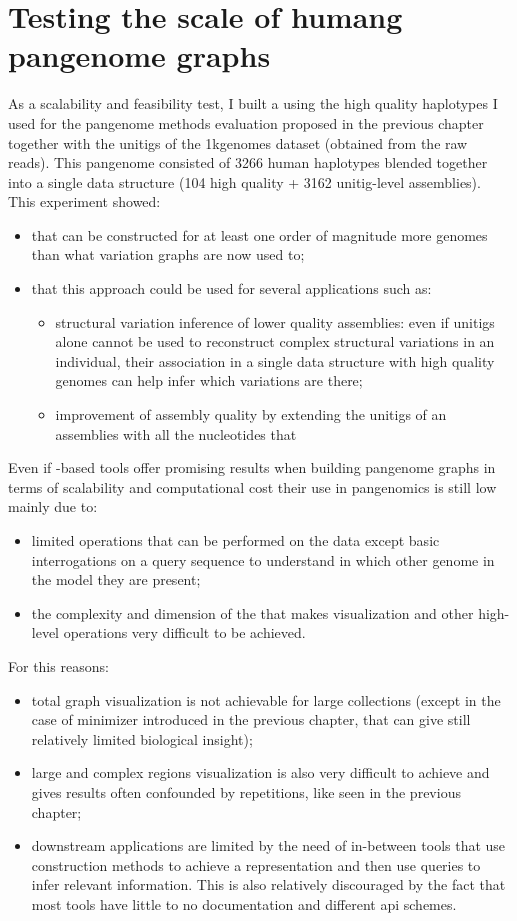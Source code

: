 \section{Testing the scale of humang pangenome graphs}
As a scalability and feasibility test, I built a \ccdbg using the high quality haplotypes I used for the pangenome methods evaluation proposed in the previous chapter together with the unitigs of the 1kgenomes dataset (obtained from the raw reads). This pangenome consisted of 3266 human haplotypes blended together into a single data structure (104 high quality + 3162 unitig-level assemblies). This experiment showed:
\begin{itemize}
	\item that \ccdbgs can be constructed for at least one order of magnitude more genomes than what variation graphs are now used to;
	\item that this approach could be used for several applications such as:
	\begin{itemize}
		\item structural variation inference of lower quality assemblies: even if unitigs alone cannot be used to reconstruct complex structural variations in an individual, their association in a single data structure with high quality genomes can help infer which variations are there;
		\item improvement of assembly quality by extending the unitigs of an assemblies with all the nucleotides that 
	\end{itemize}
\end{itemize}
Even if \dbg-based tools offer promising results when building pangenome graphs in terms of scalability and computational cost their use in pangenomics is still low mainly due to:
\begin{itemize}
	\item limited operations that can be performed on the data except basic \kmer interrogations on a query sequence to understand in which other genome in the model they are present;
	\item the complexity and dimension of the \ccdbgs that makes visualization and other high-level operations very difficult to be achieved.
\end{itemize}
For this reasons:
\begin{itemize}
	\item total graph visualization is not achievable for large collections (except in the case of minimizer \dbgs introduced in the previous chapter, that can give still relatively limited biological insight);
	\item large and complex regions visualization is also very difficult to achieve and gives results often confounded by repetitions, like seen in the previous chapter;
	\item downstream applications are limited by the need of in-between tools that use construction methods to achieve a representation and then use queries to infer relevant information. This is also relatively discouraged by the fact that most tools have little to no documentation and different api schemes.
\end{itemize}